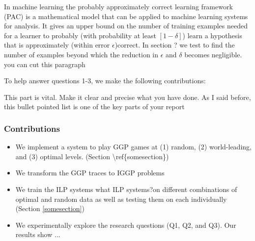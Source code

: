 In machine learning the probably approximately correct learning framework (PAC) is a mathematical model that can be applied to machine learning systems for analysis. It gives an upper bound on the number of training examples needed for a learner to probably (with probability at least $[1-\delta]$) learn a hypothesis that is approximately (within error $\epsilon$)correct\cite{Mitchell/MachineLearing}. In section ? we test to find the number of examples beyond which the reduction in $\epsilon$ and $\delta$ becomes negligible.
\ac{you can cut this paragraph}

\ac{To help answer questions 1-3, we make the following contributions:}

\ac{This part is vital. Make it clear and precise what you have done. As I said before, this bullet pointed list is one of the key parts of your report}
\subsubsection{Contributions}
\begin{itemize}
\item \ac{We implement a system to play GGP games at (1) random, (2) world-leading, and (3) optimal levels. (Section \ref{somesection})}
\item We transform the GGP traces to IGGP problems
\item We train the ILP systems \ac{what ILP systems}?on different combinations of optimal and random data as well as testing them on each individually (Section \ref{somesection})

\item We experimentally explore the research questions (Q1, Q2, and Q3). Our results show ...
\end{itemize}